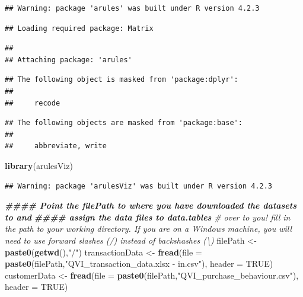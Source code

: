 \documentclass[
]{article}
\newenvironment{Shaded}{\begin{snugshade}}{\end{snugshade}}
\newcommand{\AttributeTok}[1]{\textcolor[rgb]{0.13,0.29,0.53}{#1}}
\newcommand{\CommentTok}[1]{\textcolor[rgb]{0.56,0.35,0.01}{\textit{#1}}}
\newcommand{\ConstantTok}[1]{\textcolor[rgb]{0.56,0.35,0.01}{#1}}
\newcommand{\DocumentationTok}[1]{\textcolor[rgb]{0.56,0.35,0.01}{\textbf{\textit{#1}}}}
\newcommand{\FunctionTok}[1]{\textcolor[rgb]{0.13,0.29,0.53}{\textbf{#1}}}
\newcommand{\NormalTok}[1]{#1}
\newcommand{\OtherTok}[1]{\textcolor[rgb]{0.56,0.35,0.01}{#1}}
\newcommand{\StringTok}[1]{\textcolor[rgb]{0.31,0.60,0.02}{#1}}
\begin{document}
\begin{verbatim}
## Warning: package 'arules' was built under R version 4.2.3
\end{verbatim}

\begin{verbatim}
## Loading required package: Matrix
\end{verbatim}

\begin{verbatim}
## 
## Attaching package: 'arules'
\end{verbatim}

\begin{verbatim}
## The following object is masked from 'package:dplyr':
## 
##     recode
\end{verbatim}

\begin{verbatim}
## The following objects are masked from 'package:base':
## 
##     abbreviate, write
\end{verbatim}

\begin{Shaded}
\begin{Highlighting}[]
\FunctionTok{library}\NormalTok{(arulesViz)}
\end{Highlighting}
\end{Shaded}

\begin{verbatim}
## Warning: package 'arulesViz' was built under R version 4.2.3
\end{verbatim}

\begin{Shaded}
\begin{Highlighting}[]
\DocumentationTok{\#\#\#\# Point the filePath to where you have downloaded the datasets to and }
\DocumentationTok{\#\#\#\# assign the data files to data.tables}
\CommentTok{\# over to you! fill in the path to your working directory. If you are on a Windows machine, you will need to use forward slashes (/) instead of backshashes (\textbackslash{})}
\NormalTok{filePath }\OtherTok{\textless{}{-}} \FunctionTok{paste0}\NormalTok{(}\FunctionTok{getwd}\NormalTok{(),}\StringTok{"/"}\NormalTok{)}
\NormalTok{transactionData }\OtherTok{\textless{}{-}} \FunctionTok{fread}\NormalTok{(}\AttributeTok{file =} \FunctionTok{paste0}\NormalTok{(filePath,}\StringTok{"QVI\_transaction\_data.xlsx {-} in.csv"}\NormalTok{), }\AttributeTok{header =} \ConstantTok{TRUE}\NormalTok{)}
\NormalTok{customerData }\OtherTok{\textless{}{-}} \FunctionTok{fread}\NormalTok{(}\AttributeTok{file =} \FunctionTok{paste0}\NormalTok{(filePath,}\StringTok{"QVI\_purchase\_behaviour.csv"}\NormalTok{), }\AttributeTok{header =} \ConstantTok{TRUE}\NormalTok{)}
\end{Highlighting}
\end{Shaded}
\end{document}
